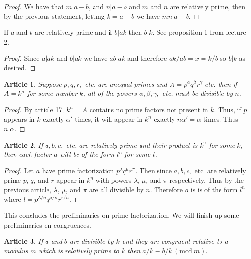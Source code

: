 \documentclass{article}
\theoremstyle{problemstyle}
\newtheorem{article}{Article}
\newcommand{\Mod}[1]{\ (\mathrm{mod}\ #1)}
\begin{document}
\begin{proof}
We have that $m|a-b$, and $n|a-b$ and $m$ and $n$ are relatively prime, then by the previous statement, letting $k = a-b$ we have $mn|a-b$. 
\end{proof}

If $a$ and $b$ are relatively prime and if $b|ak$ then $b|k$. See proposition 1 from lecture 2. 

\begin{proof}
Since $a|ak$ and $b|ak$ we have $ab|ak$ and therefore $ak/ab = x = k/b$ so $b|k$ as desired. 
\end{proof}

\begin{article}
Suppose $p,q,r,$ etc. are unequal primes and $A = p^\alpha q^\beta r^\gamma$ etc. then if $A = k^n$ for some number $k$, all of the powers $\alpha, \beta, \gamma,$ etc. must be divisible by $n$. 
\end{article}

\begin{proof}
By article 17, $k^n = A$ contains no prime factors not present in $k$. Thus, if $p$ appears in $k$ exactly $\alpha'$ times, it will appear in $k^n$ exactly $n\alpha' = \alpha$ times. Thus $n|\alpha$. 
\end{proof}

\begin{article}
If $a,b,c,$ etc. are relatively prime and their product is $k^n$ for some $k$, then each factor $a$ will be of the form $l^n$ for some $l$. 
\end{article}

\begin{proof}
Let $a$ have prime factorization $p^\lambda q^\mu r^\pi$. Then since $a,b,c,$ etc. are relatively prime $p$, $q$, and $r$ appear in $k^n$ with powers $\lambda$, $\mu$, and $\pi$ respectively. Thus by the previous article, $\lambda$, $\mu$, and $\pi$ are all divisible by $n$. Therefore $a$ is is of the form $l^n$ where $l = p^{\lambda/n} q^{\mu/n} r^{\pi/n}.$
\end{proof}

This concludes the preliminaries on prime factorization. We will finish up some preliminaries on congruences. 

\begin{article}
If $a$ and $b$ are divisible by $k$ and they are congruent relative to a modulus $m$ which is relatively prime to $k$ then $a/k \equiv b/k \Mod{m}$.
\end{article}
\end{document}
